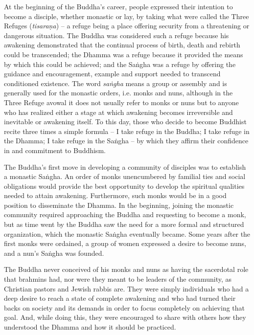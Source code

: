 At the beginning of the Buddha's career, people expressed their
intention to become a disciple, whether monastic or lay, by taking what
were called the Three Refuges (\emph{tisaraṇa}) -- a refuge being a
place offering security from a threatening or dangerous situation. The
Buddha was considered such a refuge because his awakening demonstrated
that the continual process of birth, death and rebirth could be
transcended; the Dhamma was a refuge because it provided the means by
which this could be achieved; and the Saṅgha was a refuge by offering
the guidance and encouragement, example and support needed to transcend
conditioned existence. The word \emph{saṅgha} means a group or assembly
and is generally used for the monastic orders, i.e. monks and nuns,
although in the Three Refuge avowal it does not usually refer to monks
or nuns but to anyone who has realized either a stage at which awakening
becomes irreversible and inevitable or awakening itself. To this day,
those who decide to become Buddhist recite three times a simple formula
-- I take refuge in the Buddha; I take refuge in the Dhamma; I take
refuge in the Saṅgha -- by which they affirm their confidence in and
commitment to Buddhism.

The Buddha's first move in developing a community of disciples was to
establish a monastic Saṅgha. An order of monks unencumbered by familial
ties and social obligations would provide the best opportunity to
develop the spiritual qualities needed to attain awakening. Furthermore,
such monks would be in a good position to disseminate the Dhamma. In the
beginning, joining the monastic community required approaching the
Buddha and requesting to become a monk, but as time went by the Buddha
saw the need for a more formal and structured organization, which the
monastic Saṅgha eventually became. Some years after the first monks were
ordained, a group of women expressed a desire to become nuns, and a
nun's Saṅgha was founded.

The Buddha never conceived of his monks and nuns as having the
sacerdotal role that brahmins had, nor were they meant to be leaders of
the community, as Christian pastors and Jewish rabbis are. They were
simply individuals who had a deep desire to reach a state of complete
awakening and who had turned their backs on society and its demands in
order to focus completely on achieving that goal. And, while doing this,
they were encouraged to share with others how they understood the Dhamma
and how it should be practiced.

